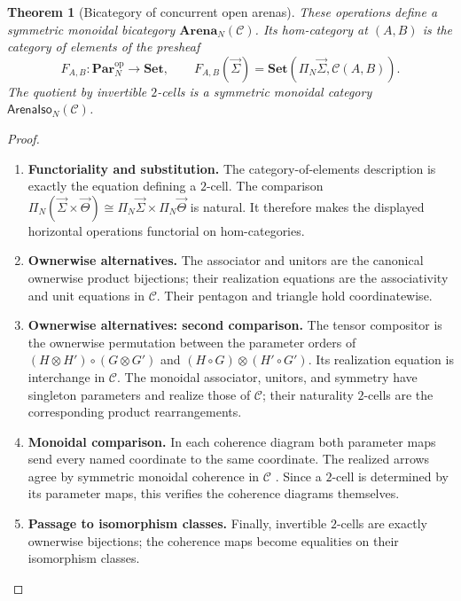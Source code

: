 \documentclass[11pt,a4paper]{article}
\numberwithin{equation}{section}
\newtheorem{theorem}{Theorem}[section]
\theoremstyle{definition}
\theoremstyle{remark}
\theoremstyle{plain}
\begin{document}
\begin{theorem}[Bicategory of concurrent open arenas]
\label{thm:egt-owned}
These operations define a symmetric monoidal bicategory
$\mathbf{Arena}_N(\mathcal C)$. Its hom-category at $(A,B)$ is the category of
elements of the presheaf
\[
 F_{A,B}:\mathbf{Par}_N^{\mathrm{op}}\to\mathbf{Set},
 \qquad F_{A,B}(\vec\Sigma)
 =\mathbf{Set}(\Pi_N\vec\Sigma,\mathcal C(A,B)).
\]
The quotient by invertible $2$-cells is a symmetric monoidal category
$\mathsf{ArenaIso}_N(\mathcal C)$.
\end{theorem}
\begin{proof}
\leavevmode
\begin{enumerate}[label=\textup{(\arabic*)},leftmargin=*,itemsep=4pt,topsep=3pt]
  \item \textbf{Functoriality and substitution.} The category-of-elements description is exactly the equation defining a
$2$-cell. The comparison
$\Pi_N(\vec\Sigma\times\vec\Theta)\cong
\Pi_N\vec\Sigma\times\Pi_N\vec\Theta$ is natural. It therefore makes the
displayed horizontal operations functorial on hom-categories.
  \item \textbf{Ownerwise alternatives.} The associator and unitors are the canonical ownerwise product bijections;
their realization equations are the associativity and unit equations in
$\mathcal C$. Their pentagon and triangle hold coordinatewise.
  \item \textbf{Ownerwise alternatives: second comparison.} The tensor compositor is the ownerwise permutation between the parameter
orders of $(H\otimes H')\circ(G\otimes G')$ and
$(H\circ G)\otimes(H'\circ G')$. Its realization equation is interchange
in $\mathcal C$. The monoidal associator, unitors, and symmetry have
singleton parameters and realize those of $\mathcal C$; their naturality
$2$-cells are the corresponding product rearrangements.
  \item \textbf{Monoidal comparison.} In each coherence
diagram both parameter maps send every named coordinate to the same
coordinate. The realized arrows agree by symmetric monoidal coherence in
$\mathcal C$ \citep{Selinger2011}. Since a $2$-cell is determined by its
parameter maps, this verifies the coherence diagrams themselves.
  \item \textbf{Passage to isomorphism classes.} Finally,
invertible $2$-cells are exactly ownerwise bijections; the coherence maps
become equalities on their isomorphism classes.
\end{enumerate}
\end{proof}
\end{document}
